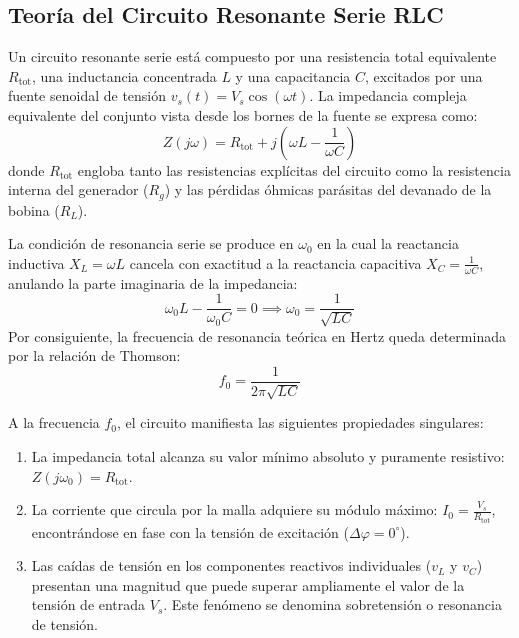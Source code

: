 \subsection{Teoría del Circuito Resonante Serie RLC}
Un circuito resonante serie está compuesto por una resistencia total equivalente $R_{\text{tot}}$, una inductancia
concentrada $L$ y una capacitancia $C$, excitados por una fuente senoidal de tensión $v_s(t) = V_s \cos(\omega t)$.
La impedancia compleja equivalente del conjunto vista desde los bornes de la fuente se expresa como:
\begin{equation}
    Z(j\omega) = R_{\text{tot}} + j \left( \omega L - \frac{1}{\omega C} \right)
    \label{eq.ej1:impedancia}
\end{equation}
donde $R_{\text{tot}}$ engloba tanto las resistencias explícitas del circuito como la resistencia interna del
generador ($R_g$) y las pérdidas óhmicas parásitas del devanado de la bobina ($R_L$).

La condición de resonancia serie se produce en $\omega_0$ en la cual la reactancia inductiva
$X_L = \omega L$ cancela con exactitud a la reactancia capacitiva $X_C = \frac{1}{\omega C}$, anulando la parte
imaginaria de la impedancia:
\begin{equation}
    \omega_0 L - \frac{1}{\omega_0 C} = 0 \implies \omega_0 = \frac{1}{\sqrt{LC}}
    \label{eq.ej1:w0}
\end{equation}
Por consiguiente, la frecuencia de resonancia teórica en Hertz queda determinada por la relación de Thomson:
\begin{equation}
    f_0 = \frac{1}{2 \pi \sqrt{L C}}
    \label{eq.ej1:fres}
\end{equation}

A la frecuencia $f_0$, el circuito manifiesta las siguientes propiedades singulares:
\begin{enumerate}
    \item La impedancia total alcanza su valor mínimo absoluto y puramente resistivo: $Z(j\omega_0) = R_{\text{tot}}$.
    \item La corriente que circula por la malla adquiere su módulo máximo: $I_0 = \frac{V_s}{R_{\text{tot}}}$,
    encontrándose en fase con la tensión de excitación ($\Delta \varphi = 0^\circ$).
    \item Las caídas de tensión en los componentes reactivos individuales ($v_L$ y $v_C$) presentan una magnitud que
    puede superar ampliamente el valor de la tensión de entrada $V_s$. Este fenómeno se denomina sobretensión o
    resonancia de tensión.
\end{enumerate}


